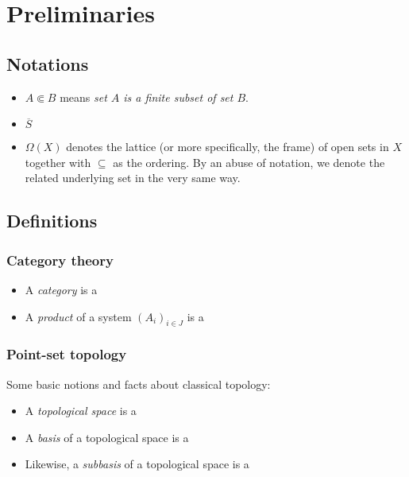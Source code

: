 \chapter*{Preliminaries}

\section*{Notations}

\begin{itemize}
\item $A \Subset B$ means {\sl set $A$ is a finite subset of set $B$\/}.
\item $\overline{S}$ 
\item $\Omega(X)$ denotes the lattice (or more specifically, the frame) of open
sets in $X$ together with $\subseteq$ as the ordering. 
By an abuse of notation, we denote the related underlying set in the very same
way.
\end{itemize}

\section*{Definitions}

\subsection*{Category theory}

\begin{itemize}
\item A \emph{category} is a
\item A \emph{product} of a system $\left(A_i\right)_{i\in J}$ is a
\end{itemize}

\subsection*{Point-set topology}

Some basic notions and facts about classical topology:

\begin{itemize}
\item A \emph{topological space} is a
\item A \emph{basis} of a topological space is a
\item Likewise, a \emph{subbasis} of a topological space is a
\end{itemize}

